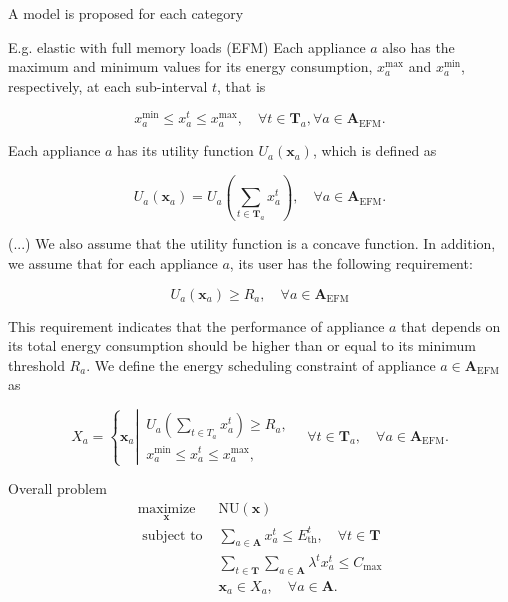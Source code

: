 \begin{frame}{A model is proposed for each category}
\end{frame} \begin{frame}{E.g. elastic with full memory loads (EFM)}
Each appliance $a$ also has the maximum and minimum values for its energy consumption, $x_{a}^{\max }$ and $x_{a}^{\min }$, respectively, at each sub-interval $t$, that is


\begin{equation*}
x_{a}^{\min } \leq x_{a}^{t} \leq x_{a}^{\max }, \quad \forall t \in \boldsymbol{T}_{a}, \forall a \in \boldsymbol{A}_{\mathrm{EFM}} . \tag{10}
\end{equation*}


Each appliance $a$ has its utility function $U_{a}\left(\boldsymbol{x}_{a}\right)$, which is defined as


\begin{equation*}
U_{a}\left(\boldsymbol{x}_{a}\right)=U_{a}\left(\sum_{t \in \boldsymbol{T}_{a}} x_{a}^{t}\right), \quad \forall a \in \boldsymbol{A}_{\mathrm{EFM}} . \tag{11}
\end{equation*}


\end{frame} \begin{frame}{(...)}
We also assume that the utility function is a concave function. In addition, we assume that for each appliance $a$, its user has the following requirement:


\begin{equation*}
U_{a}\left(\boldsymbol{x}_{a}\right) \geq R_{a}, \quad \forall a \in \boldsymbol{A}_{\mathrm{EFM}} \tag{12}
\end{equation*}


This requirement indicates that the performance of appliance $a$ that depends on its total energy consumption should be higher than or equal to its minimum threshold $R_{a}$. We define the energy scheduling constraint of appliance $a \in \boldsymbol{A}_{\mathrm{EFM}}$ as

\[
X_{a}=\left\{\boldsymbol{x}_{a} \left\lvert\, \begin{array}{l}
U_{a}\left(\sum_{t \in T_{a}} x_{a}^{t}\right) \geq R_{a},  \tag{13}\\
x_{a}^{\min } \leq x_{a}^{t} \leq x_{a}^{\max },
\end{array} \quad \forall t \in \boldsymbol{T}_{a}\right., \quad \forall a \in \boldsymbol{A}_{\mathrm{EFM}} .\right.
\]

\end{frame} \begin{frame}{Overall problem}
\[
\begin{array}{ll}
\underset{\boldsymbol{x}}{\operatorname{maximize}} & \mathrm{NU}(\boldsymbol{x}) \\
\text { subject to } & \sum_{a \in \boldsymbol{A}} x_{a}^{t} \leq E_{\mathrm{th}}^{t}, \quad \forall t \in \boldsymbol{T} \\
& \sum_{t \in \boldsymbol{T}} \sum_{a \in \boldsymbol{A}} \lambda^{t} x_{a}^{t} \leq C_{\max } \\
& \boldsymbol{x}_{a} \in X_{a}, \quad \forall a \in \boldsymbol{A} . \tag{28}
\end{array}
\]



\end{frame}
